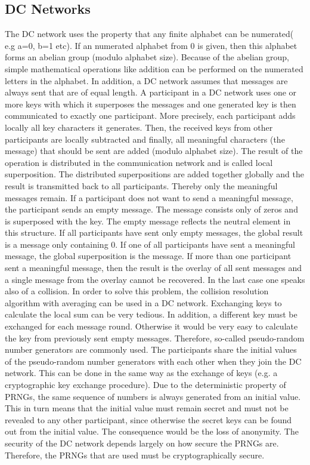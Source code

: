 \subsection{DC Networks}
The DC network uses the property that any finite alphabet can be numerated( e.g a=0, b=1 etc). If an numerated alphabet from 0 is given, then this alphabet forms an abelian group (modulo alphabet size). Because of the abelian group, simple mathematical operations like addition can be performed on the numerated letters in the alphabet.
In addition, a DC network assumes that messages are always sent that are of equal length. A participant in a DC network uses one or more keys with which it superposes the messages and one generated key is then communicated to exactly one participant. 
More precisely, each participant adds locally all key characters it generates. Then, the received keys from other participants are locally subtracted and finally, all meaningful characters (the message) that should be sent are added (modulo alphabet size). The result of the operation is distributed in the communication network and is called local superposition. 
The distributed superpositions are added together globally and the result is transmitted back to all participants. Thereby only the meaningful messages remain. If a participant does not want to send a meaningful message, the participant sends an empty message. The message consists only of zeros and is superposed with the key. The empty message reflects the neutral element in this structure. If all participants have sent only empty messages, the global result is a message only containing 0. If one of all participants have sent a meaningful message, the global superposition is the message. If more than one participant sent a meaningful message, then the result is the overlay of all sent messages and a single message from the overlay cannot be recovered. In the last case one speaks also of a collision. In order to solve this problem, the collision resolution algorithm with averaging can be used in a DC network. 
Exchanging keys to calculate the local sum can be very tedious. In addition, a different key must be exchanged for each message round. Otherwise it would be very easy to calculate the key from previously sent empty messages. Therefore, so-called pseudo-random number generators are commonly used. The participants share the initial values of the pseudo-random number generators with each other when they join the DC network. This can be done in the same way as the exchange of keys (e.g. a cryptographic key exchange procedure). Due to the deterministic property of PRNGs, the same sequence of numbers is always generated from an initial value. This in turn means that the initial value must remain secret and must not be revealed to any other participant, since otherwise the secret keys can be found out from the initial value. The consequence would be the loss of anonymity. The security of the DC network depends largely on how secure the PRNGs are. Therefore, the PRNGs that are used must be cryptographically secure.\\
